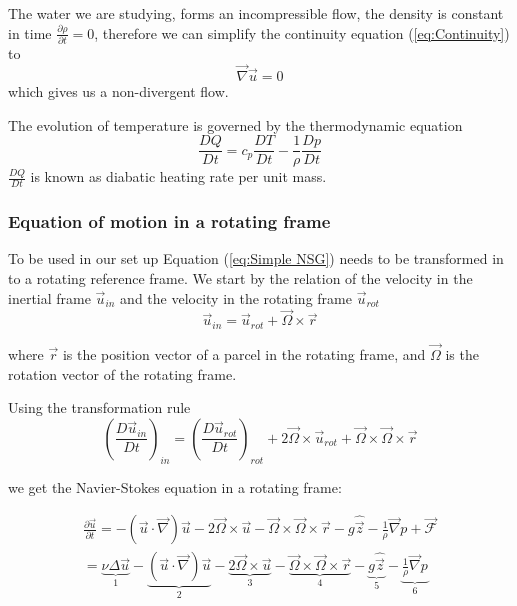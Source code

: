 \documentclass[12pt, a4paper, twoside]{article}
\begin{document}
		The water we are studying, forms an incompressible flow, the density is constant in time %
		 $\frac{\partial\rho}{\partial t} =0 $, therefore we can simplify the continuity equation (\ref{eq:Continuity}) to
		\begin{equation}
			\vec{\nabla} \vec{u} = 0
			\label{eq:nondivergence}
		\end{equation}
		which gives us a non-divergent flow.
		
		The evolution of temperature is governed by the thermodynamic equation
		\begin{equation}
			\frac{DQ}{Dt} = c_p \frac{DT}{Dt} - \frac{1}{\rho} \frac{Dp}{Dt}
			\label{eq:Thermodyn}
		\end{equation}
		$\frac{DQ}{Dt}$ is known as diabatic heating rate per unit mass. %
		
		
		\subsubsection{Equation of motion in a rotating frame}		%
			To be used in our set up Equation (\ref{eq:Simple NSG}) needs to be transformed in to a rotating reference frame. We start by the relation of the velocity in the inertial frame $\vec{u}_{in}$ and the velocity in the rotating frame $\vec{u}_{rot}$
			\begin{equation}
				\vec{u}_{in} = \vec{u}_{rot} + \vec{\Omega}\times\vec{r}
				\label{eq:Velocity Frames}
			\end{equation}
			
			where $\vec{r}$ is the position vector of a parcel in the rotating frame, and $\vec{\Omega}$ is the rotation vector of the rotating frame.
			
			Using the transformation rule %
			\begin{equation}
				\left(\frac{D\vec{u}_{in}}{Dt}\right)_{in} = \left(\frac{D\vec{u}_{rot}}{Dt}\right)_{rot} + 2\vec{\Omega}\times\vec{u}_{rot} + \vec{\Omega}\times\vec{\Omega}\times\vec{r}
				\label{eq: Lag Dev Rot}
			\end{equation}
			
			we get the Navier-Stokes equation in a rotating frame:
			
			\begin{eqnarray}
				\frac{\partial\vec{u}}{\partial t}
				= - \left(\vec{u}\cdot\vec{\nabla}\right)\vec{u} - 2\vec{\Omega}\times\vec{u} - \vec{\Omega}\times\vec{\Omega}\times\vec{r} - g\hat{\vec{z}} - \frac{1}{\rho}\vec{\nabla}p + \vec{\mathcal{F}}
				\nonumber \\
				= \underbrace{\nu\Delta\vec{u}}_{1} - \underbrace{\left(\vec{u}\cdot\vec{\nabla}\right)\vec{u}}_{2} - \underbrace{2\vec{\Omega}\times\vec{u}}_{3}- \underbrace{\vec{\Omega}\times\vec{\Omega}\times\vec{r}}_{4} - \underbrace{g\hat{\vec{z}}}_{5} - \underbrace{\frac{1}{\rho}\vec{\nabla}p}_{6}
				\label{eq: NSG}
			\end{eqnarray}
			
\end{document}
